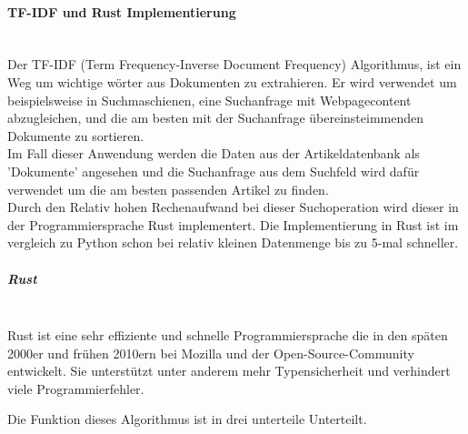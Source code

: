 \paragraph{TF-IDF und Rust Implementierung} \hspace{0pt} \\
Der TF-IDF (Term Frequency-Inverse Document Frequency) Algorithmus, ist ein Weg um wichtige wörter aus Dokumenten zu extrahieren. Er wird verwendet um beispielsweise in Suchmaschienen, eine Suchanfrage mit Webpagecontent abzugleichen, und die am besten mit der Suchanfrage übereinsteimmenden Dokumente zu sortieren. \\
Im Fall dieser Anwendung werden die Daten aus der Artikeldatenbank als 'Dokumente'  angesehen und die Suchanfrage aus dem Suchfeld wird dafür verwendet um die am besten passenden Artikel zu finden.
\\
Durch den Relativ hohen Rechenaufwand bei dieser Suchoperation wird dieser in der Programmiersprache Rust implementert. Die Implementierung in Rust ist im vergleich zu Python schon bei relativ kleinen Datenmenge bis zu 5-mal schneller.

\subparagraph{Rust}\mbox{}\\
Rust ist eine sehr effiziente und schnelle Programmiersprache die in den späten 2000er und frühen 2010ern bei Mozilla und der Open-Source-Community entwickelt. Sie unterstützt unter anderem mehr Typensicherheit und verhindert viele Programmierfehler.\cite{chatgpt}

Die Funktion dieses Algorithmus ist in drei unterteile Unterteilt.

